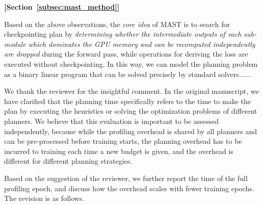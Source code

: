 \begin{sloppypar}
\begin{framed}
\textbf{[Section~\ref{subsec:mast_method}]}

Based on the above observations, the \textit{core idea} of MAST is to search for  checkpointing plan by \textit{determining whether the intermediate outputs of each sub-module which dominates the GPU memory and can be recomputed independently are dropped} during the forward pass, while operations for deriving the loss are executed without checkpointing. In this way, we can model the planning problem as a binary linear program that can be solved precisely by standard solvers......
\end{framed} 


We thank the reviewer for the insightful comment. In the original manuscript, we have clarified that the planning time specifically refers to the time to make the plan by executing the heuristics or solving the optimization problems of different planners. We believe that this evaluation is important to be assessed independently, because while the profiling overhead is shared by all planners and can be pre-processed before training starts, the planning overhead has to be incurred to training each time a new budget is given, and the overhead is different for different planning strategies. 

Based on the suggestion of the reviewer, we further report the time of the full profiling epoch, and discuss how the overhead scales with fewer training epochs. The revision is as follows.


\end{sloppypar}
